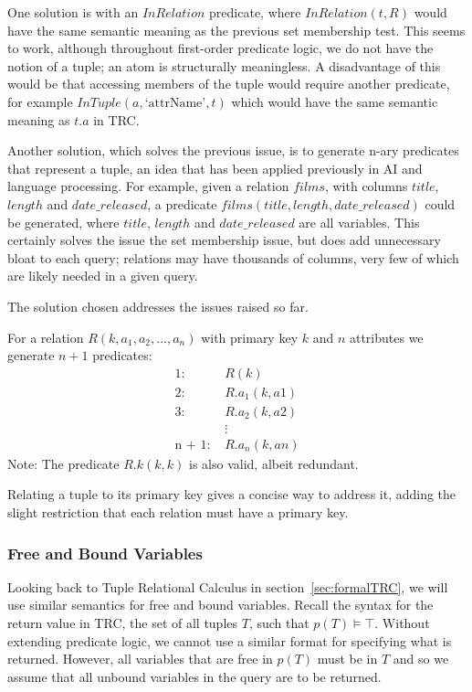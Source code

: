 \documentclass[a4paper, 11pt]{article}
\begin{document}
      One solution is with an $InRelation$ predicate, where $InRelation(t, R)$
      would have the same semantic meaning as the previous set membership test.
      This seems to work, although throughout first-order predicate logic, we
      do not have the notion of a tuple; an atom is structurally meaningless. A
      disadvantage of this would be that accessing members of the tuple would
      require another predicate, for example $InTuple(a, \text{`attrName'}, t)$
      which would have the same semantic meaning as $t.a$ in TRC.

      Another solution, which solves the previous issue, is to generate n-ary
      predicates that represent a tuple, an idea that has been applied
      previously in AI and language processing\cite{logicsemanticnetwork}. For example, given a relation $films$,
      with columns $title$, $length$ and $date\_released$, a predicate
      $films(title, length, date\_released)$ could be generated, where $title$,
      $length$ and $date\_released$ are all variables. This certainly solves the
      issue the set membership issue, but does add unnecessary bloat to each
      query; relations may have thousands of columns, very few of which are
      likely needed in a given query.

      The solution chosen addresses the issues raised so far.

      For a relation $R(k, a_{1}, a_{2}, ..., a_{n})$ with primary key $k$
      and $n$ attributes we generate $n + 1$ predicates:
      \begin{align*}
        \text{1:  }      & R(k)           \\
        \text{2:  }      & R.a_1(k, a1)   \\
        \text{3:  }      & R.a_2(k, a2)   \\
                         & \vdots         \\
        \text{n + 1:  }  & R.a_n(k, an)
      \end{align*}
      Note: The predicate $R.k(k, k)$ is also valid, albeit redundant.

      Relating a tuple to its primary key gives a concise way to address it,
      adding the slight restriction that each relation must have a primary key.

    \subsubsection{Free and Bound Variables}
      \label{sec:freebound}
      Looking back to Tuple Relational Calculus in section~\ref{sec:formalTRC},
      we will use similar semantics for free and bound variables. Recall the
      syntax for the return value in TRC, the set of all tuples $T$, such that
      $p(T) \models \top$. Without extending predicate logic, we cannot use a
      similar format for specifying what is returned. However, all variables
      that are free in $p(T)$ must be in $T$ and so we assume that all unbound
      variables in the query are to be returned.
\end{document}
